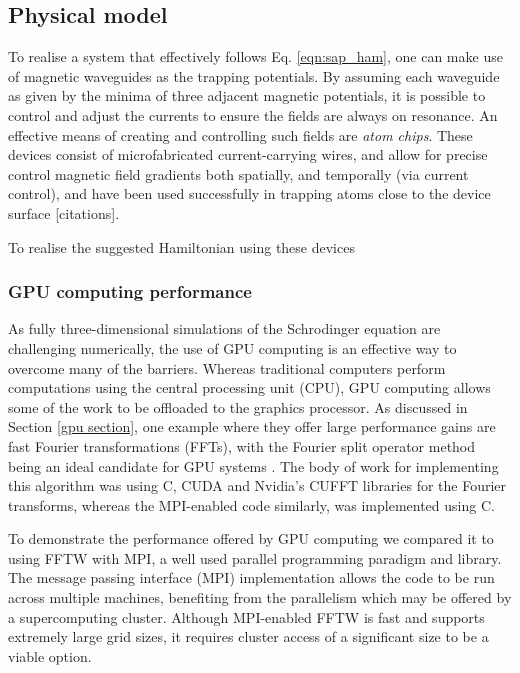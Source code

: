\subsection{Physical model}
To realise a system that effectively follows Eq. \ref{eqn:sap_ham}, one can make use of magnetic waveguides as the trapping potentials. By assuming each waveguide as given by the minima of three adjacent magnetic potentials, it is possible to control and adjust the currents to ensure the fields are always on resonance. An effective means of creating and controlling such fields are
\textit{atom chips}. These devices consist of microfabricated current-carrying wires, and allow for precise control magnetic field gradients both spatially, and temporally (via current control), and have been used successfully in trapping atoms close to the device surface [citations].

To realise the suggested Hamiltonian using these devices




\subsubsection{GPU computing performance}

As fully three-dimensional simulations of the Schrodinger equation are challenging numerically, the use of GPU computing is an effective way to overcome many of the barriers. Whereas traditional computers perform computations using the central processing unit (CPU), GPU computing allows some of the work to be offloaded to the graphics processor. As discussed in Section \ref{gpu section}, one example where they offer large performance gains are fast Fourier transformations (FFTs), with the Fourier split operator method being an ideal candidate for GPU systems \cite{Bauke:11}. The body of work for implementing this algorithm was using C, CUDA and Nvidia's CUFFT libraries for the Fourier transforms, whereas the MPI-enabled code similarly, was implemented using C.

To demonstrate the performance offered by GPU computing we compared it to using FFTW with MPI, a well used parallel programming paradigm and library. The message passing interface (MPI) implementation allows the code to be run across multiple machines, benefiting from the parallelism which may be offered by a supercomputing cluster. Although MPI-enabled FFTW is fast and supports extremely large grid sizes, it requires cluster access of a significant size to be a viable option.


